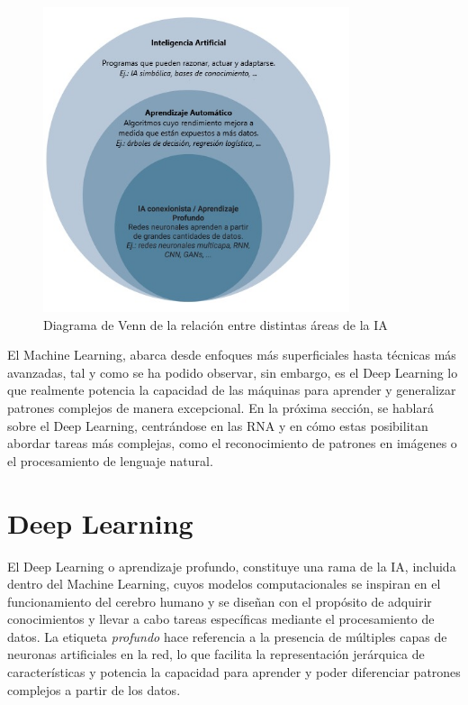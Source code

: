  \begin{figure} [H]
    \begin{center}
      \includegraphics[width=9cm]{figs/Algoritmos de ML.png}
    \end{center}
    \caption{Diagrama de Venn de la relación entre distintas áreas de la IA}
    \label{fig:AlgoritmosML}
\end{figure}
\pagebreak

El Machine Learning, abarca desde enfoques más superficiales hasta técnicas más avanzadas, tal y como se ha podido observar, sin embargo, es el Deep Learning lo que realmente potencia la capacidad de las máquinas para aprender y generalizar patrones complejos de manera excepcional. En la próxima sección, se hablará sobre el Deep Learning, centrándose en las RNA y en cómo estas posibilitan abordar tareas más complejas, como el reconocimiento de patrones en imágenes o el procesamiento de lenguaje natural.

\section{Deep Learning}
\label{sec:DeepLearning} 
El Deep Learning o aprendizaje profundo, constituye una rama de la IA, incluida dentro del Machine Learning, cuyos modelos computacionales se inspiran en el funcionamiento del cerebro humano y se diseñan con el propósito de adquirir conocimientos y llevar a cabo tareas específicas mediante el procesamiento de datos. La etiqueta \textit{profundo} hace referencia a la presencia de múltiples capas de neuronas artificiales en la red, lo que facilita la representación jerárquica de características y potencia la capacidad para aprender y poder diferenciar patrones complejos a partir de los datos.\\

